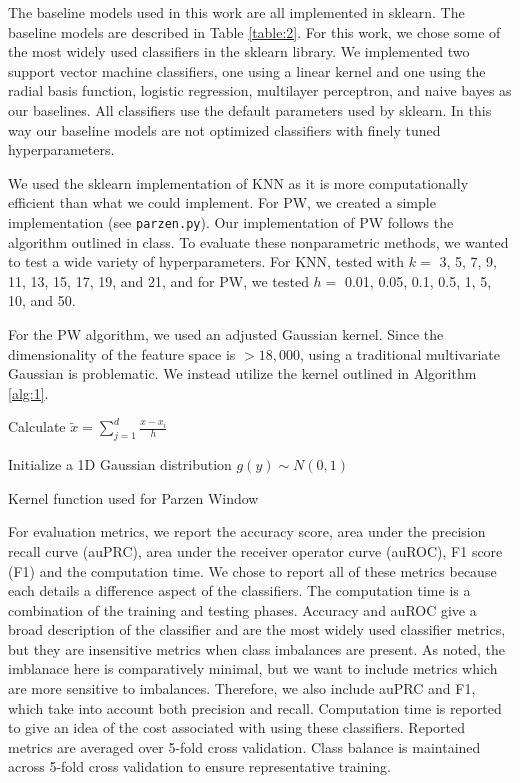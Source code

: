 \documentclass[12pt]{article}
\begin{document}
	The baseline models used in this work are all implemented in sklearn. The baseline models are described in Table \ref{table:2}. For this work, we chose some of the most widely used classifiers in the sklearn library. We implemented two support vector machine classifiers, one using a linear kernel and one using the radial basis function, logistic regression, multilayer perceptron, and naive bayes as our baselines. All classifiers use the default parameters used by sklearn. In this way our baseline models are not optimized classifiers with finely tuned hyperparameters. 
	
	We used the sklearn implementation of KNN as it is more computationally efficient than what we could implement. For PW, we created a simple implementation (see \texttt{parzen.py}). Our implementation of PW follows the algorithm outlined in class. To evaluate these nonparametric methods, we wanted to test a wide variety of hyperparameters. For KNN, tested with $k=$ 3, 5, 7, 9, 11, 13, 15, 17, 19, and 21, and for PW, we tested $h =$ 0.01, 0.05, 0.1, 0.5, 1, 5, 10, and 50.
	
	For the PW algorithm, we used an adjusted Gaussian kernel. Since the dimensionality of the feature space is $>18,000$, using a traditional multivariate Gaussian is problematic. We instead utilize the kernel outlined in Algorithm \ref{alg:1}.
	
	\begin{algorithm}
    \SetAlgoLined
     Calculate $\tilde{x} = \sum_{j = 1}^{d} \frac{x - x_i}{h}$
     
     Initialize a 1D Gaussian distribution $g(y) \sim N(0,1)$
     
     \caption{Kernel function used for Parzen Window}
     \label{alg:1}
     \end{algorithm}
	
    For evaluation metrics, we report the accuracy score, area under the precision recall curve (auPRC), area under the receiver operator curve (auROC), F1 score (F1) and the computation time. We chose to report all of these metrics because each details a difference aspect of the classifiers. The computation time is a combination of the training and testing phases. Accuracy and auROC give a broad description of the classifier and are the most widely used classifier metrics, but they are insensitive metrics when class imbalances are present. As noted, the imblanace here is comparatively minimal, but we want to include metrics which are more sensitive to imbalances. Therefore, we also include auPRC and F1, which take into account both precision and recall. Computation time is reported to give an idea of the cost associated with using these classifiers. Reported metrics are averaged over 5-fold cross validation. Class balance is maintained across 5-fold cross validation to ensure representative training. 
		
\end{document}
